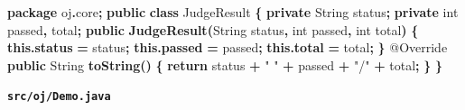 \documentclass[
  11pt,
]{ctexart}
\newenvironment{Shaded}{\begin{snugshade}}{\end{snugshade}}
\newcommand{\AttributeTok}[1]{\textcolor[rgb]{0.13,0.29,0.53}{#1}}
\newcommand{\BuiltInTok}[1]{#1}
\newcommand{\ControlFlowTok}[1]{\textcolor[rgb]{0.13,0.29,0.53}{\textbf{#1}}}
\newcommand{\DataTypeTok}[1]{\textcolor[rgb]{0.13,0.29,0.53}{#1}}
\newcommand{\FunctionTok}[1]{\textcolor[rgb]{0.13,0.29,0.53}{\textbf{#1}}}
\newcommand{\ImportTok}[1]{#1}
\newcommand{\KeywordTok}[1]{\textcolor[rgb]{0.13,0.29,0.53}{\textbf{#1}}}
\newcommand{\NormalTok}[1]{#1}
\newcommand{\OperatorTok}[1]{\textcolor[rgb]{0.81,0.36,0.00}{\textbf{#1}}}
\newcommand{\StringTok}[1]{\textcolor[rgb]{0.31,0.60,0.02}{#1}}
\begin{document}
\begin{Shaded}
\begin{Highlighting}[]
\KeywordTok{package}\ImportTok{ oj}\OperatorTok{.}\ImportTok{core}\OperatorTok{;}
\KeywordTok{public} \KeywordTok{class}\NormalTok{ JudgeResult }\OperatorTok{\{}
    \KeywordTok{private} \BuiltInTok{String}\NormalTok{ status}\OperatorTok{;} \KeywordTok{private} \DataTypeTok{int}\NormalTok{ passed}\OperatorTok{,}\NormalTok{ total}\OperatorTok{;}
    \KeywordTok{public} \FunctionTok{JudgeResult}\OperatorTok{(}\BuiltInTok{String}\NormalTok{ status}\OperatorTok{,} \DataTypeTok{int}\NormalTok{ passed}\OperatorTok{,} \DataTypeTok{int}\NormalTok{ total}\OperatorTok{)} \OperatorTok{\{} \KeywordTok{this}\OperatorTok{.}\FunctionTok{status} \OperatorTok{=}\NormalTok{ status}\OperatorTok{;} \KeywordTok{this}\OperatorTok{.}\FunctionTok{passed} \OperatorTok{=}\NormalTok{ passed}\OperatorTok{;} \KeywordTok{this}\OperatorTok{.}\FunctionTok{total} \OperatorTok{=}\NormalTok{ total}\OperatorTok{;} \OperatorTok{\}}
    \AttributeTok{@Override} \KeywordTok{public} \BuiltInTok{String} \FunctionTok{toString}\OperatorTok{()} \OperatorTok{\{} \ControlFlowTok{return}\NormalTok{ status }\OperatorTok{+} \StringTok{" "} \OperatorTok{+}\NormalTok{ passed }\OperatorTok{+} \StringTok{"/"} \OperatorTok{+}\NormalTok{ total}\OperatorTok{;} \OperatorTok{\}}
\OperatorTok{\}}
\end{Highlighting}
\end{Shaded}

\textbf{\texttt{src/oj/Demo.java}}
\end{document}
